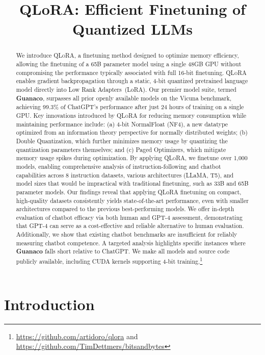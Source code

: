 \title{QLoRA: Efficient Finetuning of Quantized LLMs}

\begin{abstract}
We introduce \textsc{QLoRA}, a finetuning method designed to optimize memory efficiency, allowing the finetuning of a 65B parameter model using a single 48GB GPU without compromising the performance typically associated with full 16-bit finetuning. \textsc{QLoRA} enables gradient backpropagation through a static, 4-bit quantized pretrained language model directly into Low Rank Adapters~(LoRA). Our premier model suite, termed \textbf{Guanaco}, surpasses all prior openly available models on the Vicuna benchmark, achieving 99.3\% of ChatGPT’s performance after just 24 hours of training on a single GPU. Key innovations introduced by \textsc{QLoRA} for reducing memory consumption while maintaining performance include: (a) 4-bit NormalFloat (NF4), a new datatype optimized from an information theory perspective for normally distributed weights; (b) Double Quantization, which further minimizes memory usage by quantizing the quantization parameters themselves; and (c) Paged Optimizers, which mitigate memory usage spikes during optimization. By applying \textsc{QLoRA}, we finetune over 1,000 models, enabling comprehensive analysis of instruction-following and chatbot capabilities across 8 instruction datasets, various architectures (LLaMA, T5), and model sizes that would be impractical with traditional finetuning, such as 33B and 65B parameter models. Our findings reveal that applying QLoRA finetuning on compact, high-quality datasets consistently yields state-of-the-art performance, even with smaller architectures compared to the previous best-performing models. We offer in-depth evaluation of chatbot efficacy via both human and GPT-4 assessment, demonstrating that GPT-4 can serve as a cost-effective and reliable alternative to human evaluation. Additionally, we show that existing chatbot benchmarks are insufficient for reliably measuring chatbot competence. A targeted analysis highlights specific instances where \textbf{Guanaco} falls short relative to ChatGPT. We make all models and source code publicly available, including CUDA kernels supporting 4-bit training.\footnote{\url{https://github.com/artidoro/qlora} and \url{https://github.com/TimDettmers/bitsandbytes}}
\end{abstract}

\section{Introduction}

